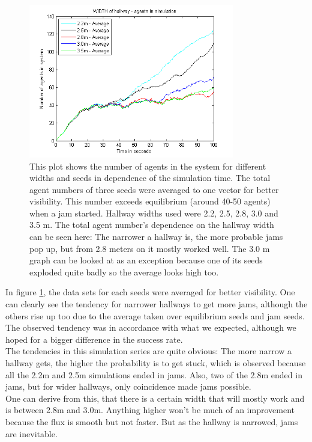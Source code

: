 \begin{figure}[h!]
	\centering
		\includegraphics[width=0.80\textwidth]{pictures/AAveragesInOne.png}
	\caption{This plot shows the number of agents in the system for different widths and seeds in dependence of the simulation time. The total agent numbers of three seeds were averaged to one vector for better visibility. This number exceeds equilibrium (around 40-50 agents) when a jam started.  Hallway widths used were 2.2, 2.5, 2.8, 3.0 and 3.5 m. The total agent number's dependence on the hallway width can be seen here: The narrower a hallway is, the more probable jams pop up, but from 2.8 meters on it mostly worked well. The 3.0 m graph can be looked at as an exception because one of its seeds exploded quite badly so the average looks high too.}
	\label{fig:AveragesInOne}
\end{figure}

\noi In figure \ref{fig:AveragesInOne}, the data sets for each seeds were averaged for better visibility. One can clearly see the tendency for narrower hallways to get more jams, although the others rise up too due to the average taken over equilibrium seeds and jam seeds.\\

\noi The observed tendency was in accordance with what we expected, although we hoped for a bigger difference in the success rate.\\

The tendencies in this simulation series are quite obvious: The more narrow a hallway gets, the higher the probability is to get stuck, which is observed because all the 2.2m and 2.5m simulations ended in jams. Also, two of the 2.8m ended in jams, but for wider hallways, only coincidence made jams possible.\\
One can derive from this, that there is a certain width that will mostly work and is between 2.8m and 3.0m. Anything higher won't be much of an improvement because the flux is smooth but not faster. But as the hallway is narrowed, jams are inevitable.\\

